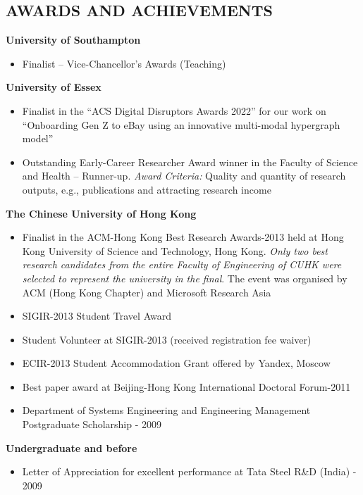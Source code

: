 \documentclass[margin]{res}
\begin{document}
\begin{resume}
\section{AWARDS AND ACHIEVEMENTS}
\textbf{University of Southampton}
\begin{itemize} \itemsep -10pt
\item Finalist -- Vice-Chancellor's Awards (Teaching)
\end{itemize}
\textbf{University of Essex}
\begin{itemize} \itemsep -10pt
\item Finalist in the ``ACS Digital Disruptors Awards 2022'' for our work on ``Onboarding Gen Z to eBay using an innovative multi-modal hypergraph model'' \\
\item Outstanding Early-Career Researcher Award winner in the Faculty of Science and Health -- Runner-up. \textit{Award Criteria:} Quality and quantity of research outputs, e.g., publications and attracting research income
\end{itemize}
\textbf{The Chinese University of Hong Kong}
\begin{itemize} \itemsep -10pt
\item Finalist in the ACM-Hong Kong Best Research Awards-2013 held at Hong Kong University of Science and Technology, Hong Kong. \textit{Only two best research candidates from the entire Faculty of Engineering of CUHK were selected to represent the university in the final}. The event was organised by ACM (Hong Kong Chapter) and Microsoft Research Asia\\
\item SIGIR-2013 Student Travel Award\\
\item Student Volunteer at SIGIR-2013 (received registration fee waiver) \\
\item ECIR-2013 Student Accommodation Grant offered by Yandex, Moscow\\
\item Best paper award at Beijing-Hong Kong International Doctoral Forum-2011\\
\item Department of Systems Engineering and Engineering Management Postgraduate Scholarship - 2009
\end{itemize}

\textbf{Undergraduate and before}
\begin{itemize} \itemsep -10pt
\item Letter of Appreciation for excellent performance at Tata Steel R\&D (India) - 2009\\


\end{itemize}
\end{resume}
\end{document}
